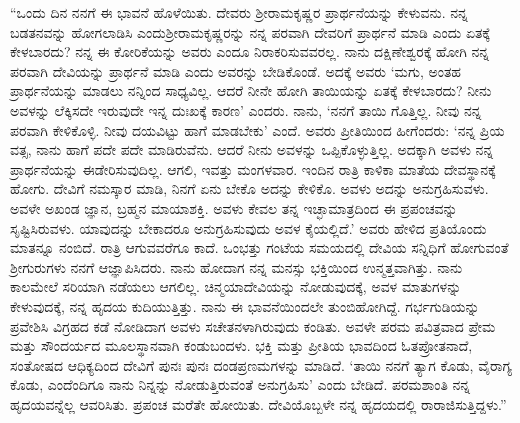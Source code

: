 “ಒಂದು ದಿನ ನನಗೆ ಈ ಭಾವನೆ ಹೊಳೆಯಿತು. ದೇವರು ಶ‍್ರೀರಾಮಕೃಷ್ಣರ ಪ್ರಾರ್ಥನೆಯನ್ನು ಕೇಳುವನು. ನನ್ನ ಬಡತನವನ್ನು ಹೋಗಲಾಡಿಸಿ ಎಂದು\break ಶ‍್ರೀರಾಮಕೃಷ್ಣರನ್ನು ನನ್ನ ಪರವಾಗಿ ದೇವರಿಗೆ ಪ್ರಾರ್ಥನೆ ಮಾಡಿ ಎಂದು ಏತಕ್ಕೆ ಕೇಳಬಾರದು? ನನ್ನ ಈ ಕೋರಿಕೆಯನ್ನು ಅವರು ಎಂದೂ ನಿರಾಕರಿಸುವವರಲ್ಲ. ನಾನು ದಕ್ಷಿಣೇಶ್ವರಕ್ಕೆ ಹೋಗಿ ನನ್ನ ಪರವಾಗಿ ದೇವಿಯನ್ನು ಪ್ರಾರ್ಥನೆ ಮಾಡಿ ಎಂದು ಅವರನ್ನು ಬೇಡಿಕೊಂಡೆ. ಅದಕ್ಕೆ ಅವರು ‘ಮಗು, ಅಂತಹ ಪ್ರಾರ್ಥನೆಯನ್ನು ಮಾಡಲು ನನ್ನಿಂದ ಸಾಧ್ಯವಿಲ್ಲ. ಆದರೆ ನೀನೇ ಹೋಗಿ ತಾಯಿಯನ್ನು ಏತಕ್ಕೆ ಕೇಳಬಾರದು? ನೀನು ಅವಳನ್ನು ಲೆಕ್ಕಿಸದೇ ಇರುವುದೇ ಇನ್ನ ದುಃಖಕ್ಕೆ ಕಾರಣ’ ಎಂದರು. ನಾನು, ‘ನನಗೆ ತಾಯಿ ಗೊತ್ತಿಲ್ಲ. ನೀವು ನನ್ನ ಪರವಾಗಿ ಕೇಳಿಕೊಳ್ಳಿ. ನೀವು ದಯವಿಟ್ಟು ಹಾಗೆ ಮಾಡಬೇಕು’ ಎಂದೆ. ಅವರು ಪ್ರೀತಿಯಿಂದ ಹೀಗೆಂದರು: ‘ನನ್ನ ಪ್ರಿಯ ವತ್ಸ, ನಾನು ಹಾಗೆ ಪದೇ ಪದೇ ಮಾಡಿರುವೆನು. ಆದರೆ ನೀನು ಅವಳನ್ನು ಒಪ್ಪಿಕೊಳ್ಳುತ್ತಿಲ್ಲ. ಅದಕ್ಕಾಗಿ ಅವಳು ನನ್ನ ಪ್ರಾರ್ಥನೆಯನ್ನು ಈಡೇರಿಸುವುದಿಲ್ಲ. ಆಗಲಿ, ಇವತ್ತು ಮಂಗಳವಾರ. ಇಂದಿನ ರಾತ್ರಿ ಕಾಳಿಕಾ ಮಾತೆಯ ದೇವಸ್ಥಾನಕ್ಕೆ ಹೋಗು. ದೇವಿಗೆ ನಮಸ್ಕಾರ ಮಾಡಿ, ನಿನಗೆ ಏನು ಬೇಕೊ ಅದನ್ನು ಕೇಳಿಕೊ. ಅವಳು ಅದನ್ನು ಅನುಗ್ರಹಿಸುವಳು. ಅವಳೇ ಅಖಂಡ ಜ್ಞಾನ, ಬ್ರಹ್ಮನ ಮಾಯಾಶಕ್ತಿ. ಅವಳು ಕೇವಲ ತನ್ನ ಇಚ್ಛಾಮಾತ್ರದಿಂದ ಈ ಪ್ರಪಂಚವನ್ನು ಸೃಷ್ಟಿಸಿರುವಳು. ಯಾವುದನ್ನು ಬೇಕಾದರೂ ಅನುಗ್ರಹಿಸುವುದು ಅವಳ ಕೈಯಲ್ಲಿದೆ.’ ಅವರು ಹೇಳಿದ ಪ್ರತಿಯೊಂದು ಮಾತನ್ನೂ ನಂಬಿದೆ. ರಾತ್ರಿ ಆಗುವವರೆಗೂ ಕಾದೆ. ಒಂಭತ್ತು ಗಂಟೆಯ ಸಮಯದಲ್ಲಿ ದೇವಿಯ ಸನ್ನಿಧಿಗೆ ಹೋಗುವಂತೆ ಶ‍್ರೀಗುರುಗಳು ನನಗೆ ಆಜ್ಞಾಪಿಸಿದರು. ನಾನು ಹೋದಾಗ ನನ್ನ ಮನಸ್ಸು ಭಕ್ತಿಯಿಂದ ಉನ್ಮತ್ತವಾಗಿತ್ತು. ನಾನು ಕಾಲಮೇಲೆ ಸರಿಯಾಗಿ ನಡೆಯಲು ಆಗಲಿಲ್ಲ. ಚಿನ್ಮಯಾದೇವಿಯನ್ನು ನೋಡುವುದಕ್ಕೆ, ಅವಳ ಮಾತುಗಳನ್ನು ಕೇಳುವುದಕ್ಕೆ, ನನ್ನ ಹೃದಯ ಕುದಿಯುತ್ತಿತ್ತು. ನಾನು ಈ ಭಾವನೆಯಿಂದಲೇ ತುಂಬಿಹೋಗಿದ್ದೆ. ಗರ್ಭಗುಡಿಯನ್ನು ಪ್ರವೇಶಿಸಿ ವಿಗ್ರಹದ ಕಡೆ ನೋಡಿದಾಗ ಅವಳು ಸಚೇತನಳಾಗಿರುವುದು ಕಂಡಿತು. ಅವಳೇ ಪರಮ ಪವಿತ್ರವಾದ ಪ್ರೇಮ ಮತ್ತು ಸೌಂದರ್ಯದ ಮೂಲಸ್ಥಾನವಾಗಿ ಕಂಡುಬಂದಳು. ಭಕ್ತಿ ಮತ್ತು ಪ್ರೀತಿಯ ಭಾವದಿಂದ ಓತಪ್ರೋತನಾದೆ, ಸಂತೋಷದ ಆಧಿಕ್ಯದಿಂದ ದೇವಿಗೆ ಪುನಃ ಪುನಃ ದಂಡಪ್ರಣಮಗಳನ್ನು ಮಾಡಿದೆ. ‘ತಾಯಿ ನನಗೆ ತ್ಯಾಗ ಕೊಡು, ವೈರಾಗ್ಯ ಕೊಡು, ಎಂದೆಂದಿಗೂ ನಾನು ನಿನ್ನನ್ನು ನೋಡುತ್ತಿರುವಂತೆ ಅನುಗ್ರಹಿಸು’ ಎಂದು ಬೇಡಿದೆ. ಪರಮಶಾಂತಿ ನನ್ನ ಹೃದಯವನ್ನೆಲ್ಲ ಆವರಿಸಿತು. ಪ್ರಪಂಚ ಮರೆತೇ ಹೋಯಿತು. ದೇವಿಯೊಬ್ಬಳೇ ನನ್ನ ಹೃದಯದಲ್ಲಿ ರಾರಾಜಿಸುತ್ತಿದ್ದಳು.”

